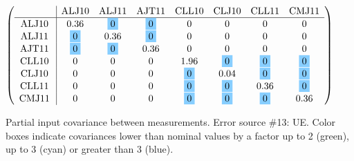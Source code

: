 \begin{table}[H]
\scriptsize
\begin{center}
\renewcommand{\arraystretch}{1.1}
\begin{math}\left(\begin{array}{c|ccccccc}
 & \mathrm{ALJ10} & 
\mathrm{ALJ11} & 
\mathrm{AJT11} & 
\mathrm{CLL10} & 
\mathrm{CLJ10} & 
\mathrm{CLL11} & 
\mathrm{CMJ11} \\
\hline
\mathrm{ALJ10} \hspace*{2pt} &       0.36 &  \colorbox{SkyBlue1}{$ 0$} &  \colorbox{SkyBlue1}{$ 0$} &  0 &  0 &  0 &  0 \\
\mathrm{ALJ11} \hspace*{2pt} &  \colorbox{SkyBlue1}{$ 0$} &       0.36 &  \colorbox{SkyBlue1}{$ 0$} &  0 &  0 &  0 &  0 \\
\mathrm{AJT11} \hspace*{2pt} &  \colorbox{SkyBlue1}{$ 0$} &  \colorbox{SkyBlue1}{$ 0$} &       0.36 &  0 &  0 &  0 &  0 \\
\mathrm{CLL10} \hspace*{2pt} &  0 &  0 &  0 &       1.96 &  \colorbox{SkyBlue1}{$ 0$} &  \colorbox{SkyBlue1}{$ 0$} &  \colorbox{SkyBlue1}{$ 0$} \\
\mathrm{CLJ10} \hspace*{2pt} &  0 &  0 &  0 &  \colorbox{SkyBlue1}{$ 0$} &       0.04 &  \colorbox{SkyBlue1}{$ 0$} &  \colorbox{SkyBlue1}{$ 0$} \\
\mathrm{CLL11} \hspace*{2pt} &  0 &  0 &  0 &  \colorbox{SkyBlue1}{$ 0$} &  \colorbox{SkyBlue1}{$ 0$} &       0.36 &  \colorbox{SkyBlue1}{$ 0$} \\
\mathrm{CMJ11} \hspace*{2pt} &  0 &  0 &  0 &  \colorbox{SkyBlue1}{$ 0$} &  \colorbox{SkyBlue1}{$ 0$} &  \colorbox{SkyBlue1}{$ 0$} &       0.36 \\
\end{array}\right)\end{math}
\caption{Partial input covariance between measurements. Error source \#13: UE. Color boxes indicate covariances lower than nominal values by a factor up to 2 (green), up to 3 (cyan) or greater than 3 (blue).}
\renewcommand{\arraystretch}{1}
\end{center}
\end{table}
